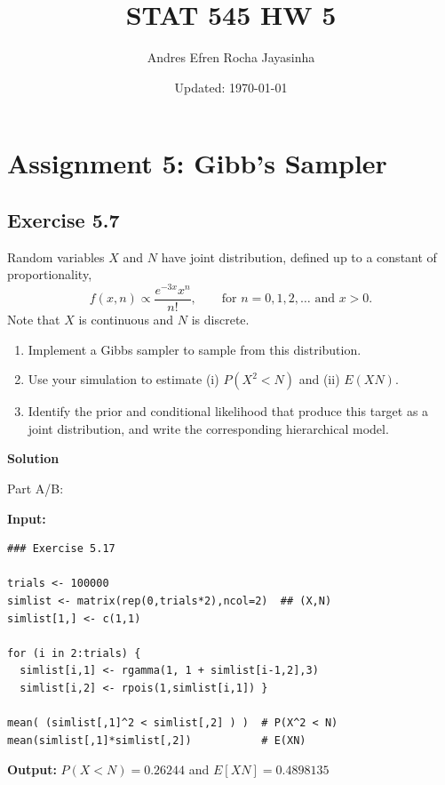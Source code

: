 \documentclass[hidelinks]{article}
\title{\textbf{STAT 545 HW 5}}
\author{Andres Efren Rocha Jayasinha}
\date{Updated: \today} %
\begin{document}
\hypersetup{bookmarksnumbered=true,}
\pagecolor{white}
\color{black}
\maketitle
\begin{Large}
\tableofcontents
\end{Large}%
\pagebreak

\section{Assignment 5: Gibb's Sampler}

\subsection{Exercise 5.7}

Random variables $X$ and $N$ have joint distribution, defined up to a constant of proportionality,
\[
f(x,n)\propto \frac{e^{-3x}x^n}{n!}, \qquad \text{for } n=0,1,2,\ldots \text{ and } x>0.
\]
Note that $X$ is continuous and $N$ is discrete.
\begin{enumerate}
  \item[(a)] Implement a Gibbs sampler to sample from this distribution.
  \item[(b)] Use your simulation to estimate (i) $P(X^2<N)$ and (ii) $E(XN)$.
  \item[(c)] Identify the prior and conditional likelihood that produce this target as a joint distribution, and write the corresponding hierarchical model.
\end{enumerate}

\noindent \textbf{Solution}

\noindent Part A/B:

\noindent \textbf{Input:}

\begin{lstlisting}[caption={Gibb's Sampler}]
### Exercise 5.17

trials <- 100000
simlist <- matrix(rep(0,trials*2),ncol=2)  ## (X,N)
simlist[1,] <- c(1,1)

for (i in 2:trials) {
  simlist[i,1] <- rgamma(1, 1 + simlist[i-1,2],3)
  simlist[i,2] <- rpois(1,simlist[i,1]) }

mean( (simlist[,1]^2 < simlist[,2] ) )  # P(X^2 < N)
mean(simlist[,1]*simlist[,2])           # E(XN)
\end{lstlisting}

\noindent \textbf{Output:} $P(X<N) = 0.26244$ and $E[XN] = 0.4898135$
\end{document}
